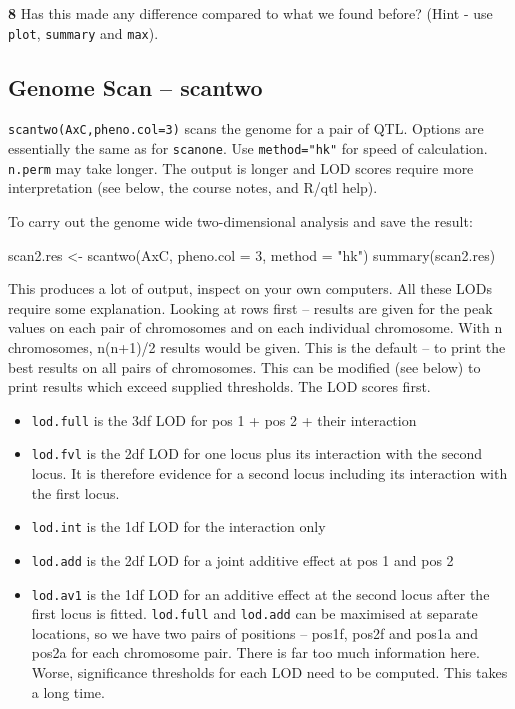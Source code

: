 \documentclass[
]{book}
\makeatletter
\newenvironment{Shaded}{\begin{snugshade}}{\end{snugshade}}
\newcommand{\AttributeTok}[1]{\textcolor[rgb]{0.77,0.63,0.00}{#1}}
\newcommand{\DecValTok}[1]{\textcolor[rgb]{0.00,0.00,0.81}{#1}}
\newcommand{\FunctionTok}[1]{\textcolor[rgb]{0.00,0.00,0.00}{#1}}
\newcommand{\NormalTok}[1]{#1}
\newcommand{\OtherTok}[1]{\textcolor[rgb]{0.56,0.35,0.01}{#1}}
\newcommand{\StringTok}[1]{\textcolor[rgb]{0.31,0.60,0.02}{#1}}
\providecommand{\tightlist}{%
  \setlength{\itemsep}{0pt}\setlength{\parskip}{0pt}}
\newenvironment{kframe}{%
\medskip{}
\setlength{\fboxsep}{.8em}
 \def\at@end@of@kframe{}%
 \ifinner\ifhmode%
  \def\at@end@of@kframe{\end{minipage}}%
  \begin{minipage}{\columnwidth}%
 \fi\fi%
 \def\FrameCommand##1{\hskip\@totalleftmargin \hskip-\fboxsep
 \colorbox{shadecolor}{##1}\hskip-\fboxsep
     \hskip-\linewidth \hskip-\@totalleftmargin \hskip\columnwidth}%
 \MakeFramed {\advance\hsize-\width
   \@totalleftmargin\z@ \linewidth\hsize
   \@setminipage}}%
 {\par\unskip\endMakeFramed%
 \at@end@of@kframe}
\newenvironment{rmdblock}[1]
  {
  \begin{itemize}
  \renewcommand{\labelitemi}{
    \raisebox{-.7\height}[0pt][0pt]{
      {\setkeys{Gin}{width=3em,keepaspectratio}\texttt{[image: images/\#1]}}
    }
  }
  \setlength{\fboxsep}{1em}
  \begin{kframe}
  \item
  }
  {
  \end{kframe}
  \end{itemize}
  }
\newenvironment{rmdquiz}
  {\begin{rmdblock}{quiz}}
  {\end{rmdblock}}
\makeatother
\begin{document}
\begin{rmdquiz}
\textbf{8}
Has this made any difference compared to what we found before? (Hint - use \texttt{plot}, \texttt{summary} and \texttt{max}).\\
\end{rmdquiz}

\hypertarget{genome-scan-scantwo}{%
\subsection{Genome Scan -- scantwo}\label{genome-scan-scantwo}}

\texttt{scantwo(AxC,pheno.col=3)} scans the genome for a pair of QTL. Options are essentially the same as for \texttt{scanone}. Use \texttt{method="hk"} for speed of calculation. \texttt{n.perm} may take longer. The output is longer and LOD scores require more interpretation (see below, the course notes, and R/qtl help).

To carry out the genome wide two-dimensional analysis and save the result:

\begin{Shaded}
\begin{Highlighting}[]
\NormalTok{scan2.res }\OtherTok{\textless{}{-}} \FunctionTok{scantwo}\NormalTok{(AxC, }\AttributeTok{pheno.col =} \DecValTok{3}\NormalTok{, }\AttributeTok{method =} \StringTok{"hk"}\NormalTok{)}
\FunctionTok{summary}\NormalTok{(scan2.res)}
\end{Highlighting}
\end{Shaded}

This produces a lot of output, inspect on your own computers. All these LODs require some explanation.
Looking at rows first -- results are given for the peak values on each pair of chromosomes and on each individual chromosome. With n chromosomes, n(n+1)/2 results would be given. This is the default -- to print the best results on all pairs of chromosomes. This can be modified (see below) to print results which exceed supplied thresholds. The LOD scores first.

\begin{itemize}
\tightlist
\item
  \texttt{lod.full} is the 3df LOD for pos 1 + pos 2 + their interaction
\item
  \texttt{lod.fvl} is the 2df LOD for one locus plus its interaction with the second locus. It is therefore evidence for a second locus including its interaction with the first locus.
\item
  \texttt{lod.int} is the 1df LOD for the interaction only
\item
  \texttt{lod.add} is the 2df LOD for a joint additive effect at pos 1 and pos 2
\item
  \texttt{lod.av1} is the 1df LOD for an additive effect at the second locus after the first locus is fitted.
  \texttt{lod.full} and \texttt{lod.add} can be maximised at separate locations, so we have two pairs of positions -- pos1f, pos2f and pos1a and pos2a for each chromosome pair. There is far too much information here. Worse, significance thresholds for each LOD need to be computed. This takes a long time.
\end{itemize}
\end{document}
